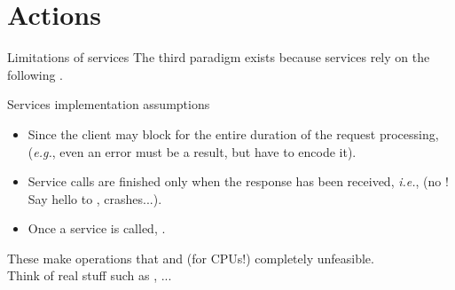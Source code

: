 
\section{Actions}
\graphicspath{{figs/section2/}}

\begin{frame}{Limitations of services}
  The third paradigm exists because services rely on the following .
  \begin{alertblock}{Services implementation assumptions}
    \begin{itemize}
      \item Since the client may block for the entire duration of the request processing,  (\emph{e.g.}, even an error must be a result, but  have to encode it).
      \item Service calls are finished only when the response has been received, \emph{i.e.},  (no ! Say hello to , crashes...).
      \item Once a service is called, .
    \end{itemize}
  \end{alertblock}
  These make operations that  and  (for CPUs!) completely unfeasible.\\
  Think of real stuff such as , ...
\end{frame}

